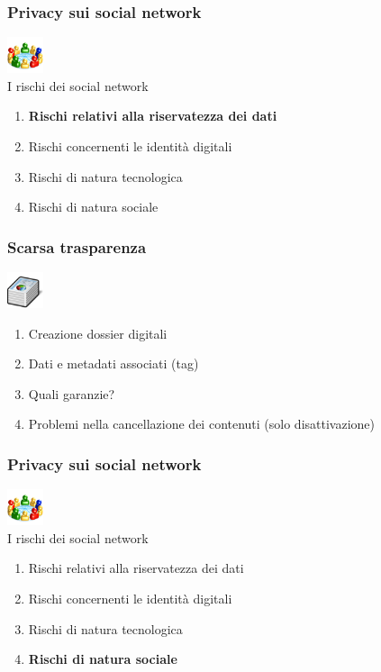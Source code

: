 \documentclass[xcolor=svgnames]{beamer}
\begin{document}
\begin{frame}
	\frametitle{Privacy sui social network}

	\begin{block}{\includegraphics[width=40px]{img/social.png} \\ I rischi dei social network}
			\begin{enumerate}
					\item {\bf Rischi relativi alla riservatezza dei dati}
					\item Rischi concernenti le identità digitali
					\item Rischi di natura tecnologica
					\item Rischi di natura sociale
			\end{enumerate}
	\end{block}
\end{frame}

\begin{frame}
	\frametitle{Scarsa trasparenza}

	\begin{block}{\includegraphics[width=40px]{img/data.png}}
			\begin{enumerate}
					\item Creazione dossier digitali
						\pause
					\item Dati e metadati associati (tag)
						\pause
					\item Quali garanzie?
						\pause
					\item Problemi nella cancellazione dei contenuti (solo disattivazione)
			\end{enumerate}
	\end{block}
\end{frame}

\begin{frame}
	\frametitle{Privacy sui social network}

	\begin{block}{\includegraphics[width=40px]{img/social.png} \\ I rischi dei social network}
			\begin{enumerate}
					\item Rischi relativi alla riservatezza dei dati
					\item Rischi concernenti le identità digitali
					\item Rischi di natura tecnologica
					\item {\bf Rischi di natura sociale}
			\end{enumerate}
	\end{block}
\end{frame}
\end{document}
